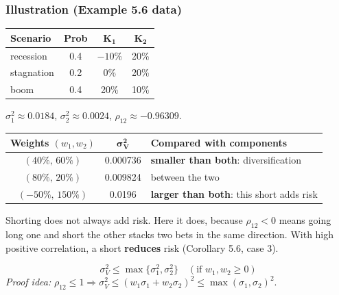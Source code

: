 \documentclass[titlepage,11pt,a4paper]{article}
\begin{document}
\subsubsection{Illustration (Example 5.6 data)}

\begin{center}\renewcommand{\arraystretch}{1.25}
\begin{tabular}{lccc}
\toprule
\textbf{\color{mycyan}Scenario} & \textbf{\color{mycyan}Prob} & $\boldsymbol{K_1}$ & $\boldsymbol{K_2}$\\
\midrule
recession  & 0.4 & $-10$\% & 20\%\\
stagnation & 0.2 & 0\%     & 20\%\\
boom       & 0.4 & 20\%    & 10\%\\
\bottomrule
\end{tabular}
\end{center}

$\sigma_1^2\approx0.0184$, $\sigma_2^2\approx0.0024$, $\rho_{12}\approx-0.96309$.

\begin{center}\renewcommand{\arraystretch}{1.25}
\begin{tabular}{@{}ccl@{}}
\toprule
\textbf{\color{mycyan}Weights $(w_1,w_2)$} & $\boldsymbol{\sigma_V^2}$ & \textbf{\color{mycyan}Compared with components}\\
\midrule
$(40\%,\,60\%)$ & 0.000736 & \textbf{smaller than both}: diversification\\
$(80\%,\,20\%)$ & 0.009824 & between the two\\
$(-50\%,\,150\%)$ & 0.0196 & \textbf{larger than both}: this short adds risk\\
\bottomrule
\end{tabular}
\end{center}

Shorting does not always add risk. Here it does, because $\rho_{12}<0$ means going long one and short the other stacks two bets in the same direction. With high positive correlation, a short \textbf{reduces} risk (Corollary 5.6, case 3).

\begin{result}
\[\sigma_V^2\le\max\{\sigma_1^2,\sigma_2^2\}\quad(\text{if }w_1,w_2\ge0)\]
\emph{Proof idea:} $\rho_{12}\le1\Rightarrow\sigma_V^2\le(w_1\sigma_1+w_2\sigma_2)^2\le\max(\sigma_1,\sigma_2)^2$.
\end{result}
\end{document}
